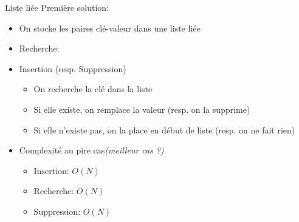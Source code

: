 \begin{frame}{Liste liée}
Première solution:
\begin{itemize}
\item On stocke les paires clé-valeur dans une liste liée
\item Recherche:
\begin{center}
{\footnotesize
{}
}
\end{center}
\item Insertion (resp. Suppression)
\begin{itemize}
\item On recherche la clé dans la liste
\item Si elle existe, on remplace la valeur (resp. on la supprime)
\item Si elle n'existe pas, on la place en début de liste (resp. on ne fait rien)
\end{itemize}
\item Complexité au pire cas\hfill{\it (meilleur cas ?)}
\begin{itemize}
\item Insertion: $O(N)$
\item Recherche: $O(N)$
\item Suppression: $O(N)$
\end{itemize}
\end{itemize}
\end{frame}

